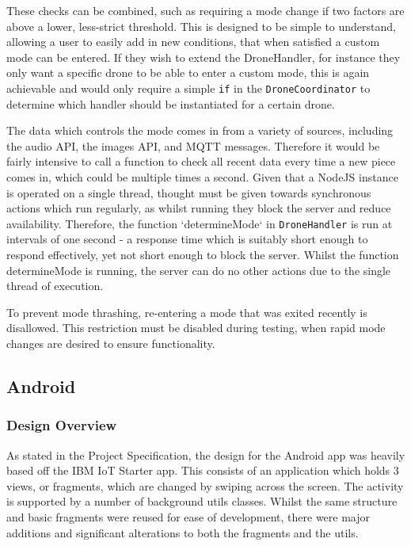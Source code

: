 \documentclass{article}
\begin{document}
These checks can be combined, such as requiring a mode change if two factors are above a lower, less-strict threshold. This is designed to be simple to understand, allowing a user to easily add in new conditions, that when satisfied a custom mode can be entered. If they wish to extend the DroneHandler, for instance they only want a specific drone to be able to enter a custom mode, this is again achievable and would only require a simple \texttt{if} in the \texttt{DroneCoordinator} to determine which handler should be instantiated for a certain drone.

The data which controls the mode comes in from a variety of sources, including the audio API, the images API, and MQTT messages. Therefore it would be fairly intensive to call a function to check all recent data every time a new piece comes in, which could be multiple times a second. Given that a NodeJS instance is operated on a single thread, thought must be given towards synchronous actions which run regularly, as whilst running they block the server and reduce availability. Therefore, the function `determineMode` in \texttt{DroneHandler} is run at intervals of one second - a response time which is suitably short enough to respond effectively, yet not short enough to block the server. Whilst the function determineMode is running, the server can do no other actions due to the single thread of execution.

To prevent mode thrashing, re-entering a mode that was exited recently is disallowed. This restriction must be disabled during testing, when rapid mode changes are desired to ensure functionality. 


\subsection{Android}
\subsubsection{Design Overview}
As stated in the Project Specification, the design for the Android app was heavily based off the IBM IoT Starter app\cite{iotStarterAndroid}. This consists of an application which holds 3 views, or fragments, which are changed by swiping across the screen. The activity is supported by a number of background utils classes. Whilst the same structure and basic fragments were reused for ease of development, there were major additions and significant alterations to both the fragments and the utils. 
\end{document}
